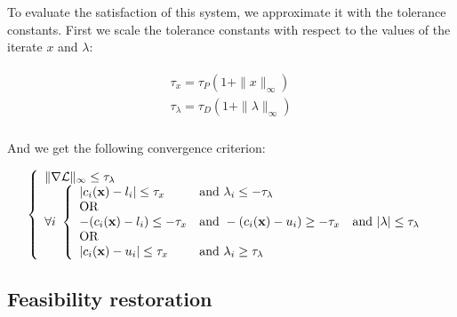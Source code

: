 To evaluate the satisfaction of this system, we approximate it with the tolerance constants.
First we scale the tolerance constants with respect to the values of the iterate $x$ and $\lambda$:

\begin{align}
\begin{split}
  \tau_x = \tau_P(1+\|x\|_\infty)\\
  \tau_\lambda =\tau_D(1+\|\lambda\|_\infty)\\
\end{split}
\end{align}

And we get the following convergence criterion:

\begin{equation}
\label{KKTfinal}
\left\{
\begin{array}{lr}
  \|\nabla \mathcal{L}\|_\infty \leq \tau_\lambda \\
  \forall i\
  \left\{
  \begin{array}{lll}
  |c_i({\bf x}) - l_i| \leq \tau_x & \text{and } \lambda_i \leq -\tau_\lambda\\
  \text{OR}\\
  -(c_i({\bf x}) - l_i) \leq -\tau_x &\text{and } -(c_i({\bf x}) - u_i) \geq -\tau_x & \text{and } |\lambda| \leq \tau_\lambda \\
  \text{OR}\\
  |c_i({\bf x}) - u_i| \leq \tau_x & \text{and } \lambda_i \geq \tau_\lambda\\
  \end{array}
  \right.
\end{array}
\right.
\end{equation}

\subsection{Feasibility restoration}
\label{sub:feasibility_restoration}

